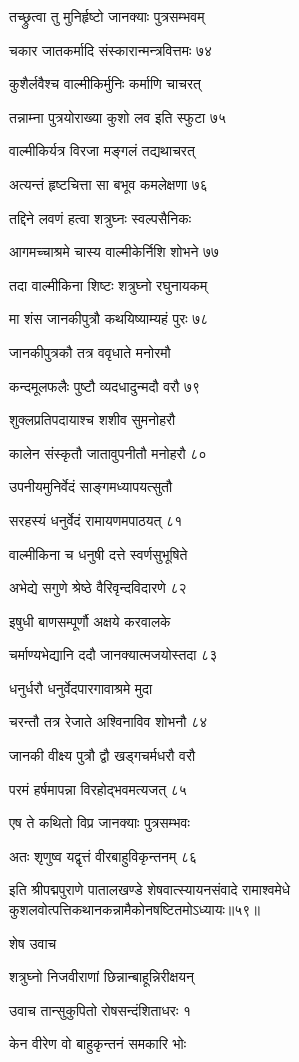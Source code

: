 तच्छ्रुत्वा तु मुनिर्हृष्टो जानक्याः पुत्रसम्भवम्

चकार जातकर्मादि संस्कारान्मन्त्रवित्तमः ७४

कुशैर्लवैश्च वाल्मीकिर्मुनिः कर्माणि चाचरत्

तन्नाम्ना पुत्रयोराख्या कुशो लव इति स्फुटा ७५

वाल्मीकिर्यत्र विरजा मङ्गलं तद्यथाचरत्

अत्यन्तं हृष्टचित्ता सा बभूव कमलेक्षणा ७६

तद्दिने लवणं हत्वा शत्रुघ्नः स्वल्पसैनिकः

आगमच्चाश्रमे चास्य वाल्मीकेर्निशि शोभने ७७

तदा वाल्मीकिना शिष्टः शत्रुघ्नो रघुनायकम्

मा शंस जानकीपुत्रौ कथयिष्याम्यहं पुरः ७८

जानकीपुत्रकौ तत्र ववृधाते मनोरमौ

कन्दमूलफलैः पुष्टौ व्यदधादुन्मदौ वरौ ७९

शुक्लप्रतिपदायाश्च शशीव सुमनोहरौ

कालेन संस्कृतौ जातावुपनीतौ मनोहरौ ८०

उपनीयमुनिर्वेदं साङ्गमध्यापयत्सुतौ

सरहस्यं धनुर्वेदं रामायणमपाठयत् ८१

वाल्मीकिना च धनुषी दत्ते स्वर्णसुभूषिते

अभेद्ये सगुणे श्रेष्ठे वैरिवृन्दविदारणे ८२

इषुधी बाणसम्पूर्णौ अक्षये करवालके

चर्माण्यभेद्यानि ददौ जानक्यात्मजयोस्तदा ८३

धनुर्धरौ धनुर्वेदपारगावाश्रमे मुदा

चरन्तौ तत्र रेजाते अश्विनाविव शोभनौ ८४

जानकी वीक्ष्य पुत्रौ द्वौ खड्गचर्मधरौ वरौ

परमं हर्षमापन्ना विरहोद्भवमत्यजत् ८५

एष ते कथितो विप्र जानक्याः पुत्रसम्भवः

अतः शृणुष्व यद्वृत्तं वीरबाहुविकृन्तनम् ८६

इति श्रीपद्मपुराणे पातालखण्डे शेषवात्स्यायनसंवादे रामाश्वमेधे कुशलवोत्पत्तिकथानकन्नामैकोनषष्टितमोऽध्यायः॥५९॥


शेष उवाच

शत्रुघ्नो निजवीराणां छिन्नान्बाहून्निरीक्षयन्

उवाच तान्सुकुपितो रोषसन्दंशिताधरः १

केन वीरेण वो बाहुकृन्तनं समकारि भोः

